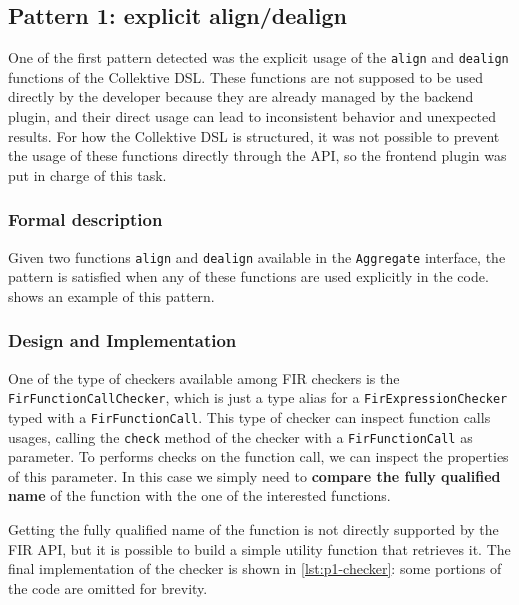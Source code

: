 \documentclass[12pt,a4paper,openright,twoside]{book}
\begin{document}
\subsection{Pattern 1: explicit align/dealign}

One of the first pattern detected was the explicit usage of the
\lstinline{align} and \lstinline{dealign} functions of the Collektive DSL. These
functions are not supposed to be used directly by the developer because they are
already managed by the backend plugin, and their direct usage can lead to
inconsistent behavior and unexpected results. For how the Collektive DSL is
structured, it was not possible to prevent the usage of these functions directly
through the API, so the frontend plugin was put in charge of this task.

\subsubsection{Formal description}

Given two functions \lstinline{align} and \lstinline{dealign} available in the
\lstinline{Aggregate} interface, the pattern is satisfied when any of these
functions are used explicitly in the code.  shows an
example of this pattern.



\subsubsection{Design and Implementation}

One of the type of checkers available among \ac{FIR} checkers is the
\lstinline{FirFunctionCallChecker}, which is just a type alias for a 
\lstinline{FirExpressionChecker} typed with a \lstinline{FirFunctionCall}. 
This type of checker can inspect function calls usages, calling the 
\lstinline{check} method of the checker with a \lstinline{FirFunctionCall}
as parameter. 
%
To performs checks on the function call, we can inspect the properties of this
parameter. In this case we simply need to \textbf{compare the fully qualified
name} of the function with the one of the interested functions.

Getting the fully qualified name of the function is not directly supported by
the \ac{FIR} API, but it is possible to build a simple utility function that
retrieves it. The final implementation of the checker is shown in
\cref{lst:p1-checker}: some portions of the code are omitted for brevity.
\end{document}
